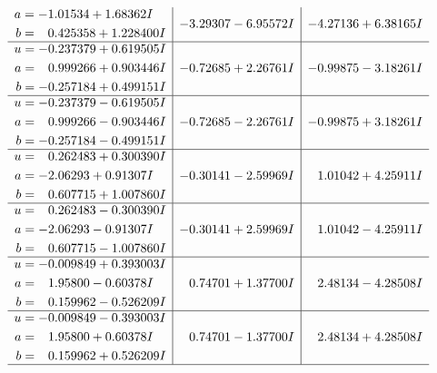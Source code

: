 \documentclass[1p]{elsarticle_modified}
\theoremstyle{definition}
\begin{document}
$$\begin{array}{c|c|c}
\begin{aligned}
a &= -1.01534 + 1.68362 I \\
b &= \phantom{-}0.425358 + 1.228400 I\end{aligned}
 & -3.29307 - 6.95572 I & -4.27136 + 6.38165 I \\ \hline\begin{aligned}
u &= -0.237379 + 0.619505 I \\
a &= \phantom{-}0.999266 + 0.903446 I \\
b &= -0.257184 + 0.499151 I\end{aligned}
 & -0.72685 + 2.26761 I & -0.99875 - 3.18261 I \\ \hline\begin{aligned}
u &= -0.237379 - 0.619505 I \\
a &= \phantom{-}0.999266 - 0.903446 I \\
b &= -0.257184 - 0.499151 I\end{aligned}
 & -0.72685 - 2.26761 I & -0.99875 + 3.18261 I \\ \hline\begin{aligned}
u &= \phantom{-}0.262483 + 0.300390 I \\
a &= -2.06293 + 0.91307 I \\
b &= \phantom{-}0.607715 + 1.007860 I\end{aligned}
 & -0.30141 - 2.59969 I & \phantom{-}1.01042 + 4.25911 I \\ \hline\begin{aligned}
u &= \phantom{-}0.262483 - 0.300390 I \\
a &= -2.06293 - 0.91307 I \\
b &= \phantom{-}0.607715 - 1.007860 I\end{aligned}
 & -0.30141 + 2.59969 I & \phantom{-}1.01042 - 4.25911 I \\ \hline\begin{aligned}
u &= -0.009849 + 0.393003 I \\
a &= \phantom{-}1.95800 - 0.60378 I \\
b &= \phantom{-}0.159962 - 0.526209 I\end{aligned}
 & \phantom{-}0.74701 + 1.37700 I & \phantom{-}2.48134 - 4.28508 I \\ \hline\begin{aligned}
u &= -0.009849 - 0.393003 I \\
a &= \phantom{-}1.95800 + 0.60378 I \\
b &= \phantom{-}0.159962 + 0.526209 I\end{aligned}
 & \phantom{-}0.74701 - 1.37700 I & \phantom{-}2.48134 + 4.28508 I\\
 \hline 
 \end{array}$$\newpage\newpage\renewcommand{\arraystretch}{1}
\end{document}
